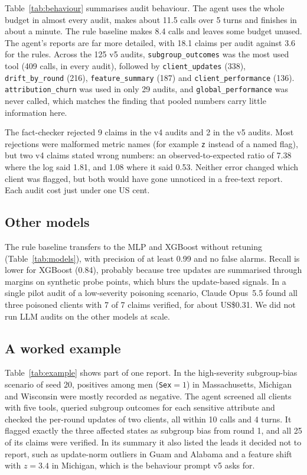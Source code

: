 \documentclass[conference]{IEEEtran}
\newcommand{\figdir}{../results/fedauditor/figures}
\begin{document}
Table~\ref{tab:behaviour} summarises audit behaviour. The agent uses the whole budget in almost every
audit, makes about 11.5 calls over 5 turns and finishes in about a minute. The rule baseline makes 8.4
calls and leaves some budget unused. The agent's reports are far more detailed, with 18.1 claims per
audit against 3.6 for the rules. Across the 125 v5 audits, \texttt{subgroup\_outcomes} was the most
used tool (409 calls, in every audit), followed by \texttt{client\_updates} (338),
\texttt{drift\_by\_round} (216), \texttt{feature\_summary} (187) and \texttt{client\_performance}
(136). \texttt{attribution\_churn} was used in only 29 audits, and \texttt{global\_performance} was
never called, which matches the finding that pooled numbers carry little information here.

The fact-checker rejected 9 claims in the v4 audits and 2 in the v5 audits. Most rejections were
malformed metric names (for example \texttt{z} instead of a named flag), but two v4 claims stated
wrong numbers: an observed-to-expected ratio of 7.38 where the log said 1.81, and 1.08 where it said
0.53. Neither error changed which client was flagged, but both would have gone unnoticed in a
free-text report. Each audit cost just under one US cent.

\subsection{Other models}

The rule baseline transfers to the MLP and XGBoost without retuning (Table~\ref{tab:models}), with
precision of at least 0.99 and no false alarms. Recall is lower for XGBoost (0.84), probably because
tree updates are summarised through margins on synthetic probe points, which blurs the update-based
signals. In a single pilot audit of a low-severity poisoning scenario, Claude Opus~5.5 found all three
poisoned clients with 7 of 7 claims verified, for about US\$0.31. We did not run LLM audits on the
other models at scale.



\subsection{A worked example}

Table~\ref{tab:example} shows part of one report. In the high-severity subgroup-bias scenario of seed
20, positives among men (\texttt{Sex}$=1$) in Massachusetts, Michigan and Wisconsin were mostly
recorded as negative. The agent screened all clients with five tools, queried subgroup outcomes for
each sensitive attribute and checked the per-round updates of two clients, all within 10 calls and 4
turns. It flagged exactly the three affected states as subgroup bias from round 1, and all 25 of its
claims were verified. In its summary it also listed the leads it decided not to report, such as
update-norm outliers in Guam and Alabama and a feature shift with $z = 3.4$ in Michigan, which is the
behaviour prompt v5 asks for.
\end{document}
